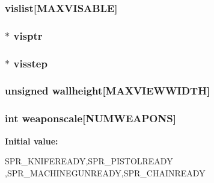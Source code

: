 \label{WL__DRAW_8C_a0ebb891d97bc41244012d2b8d7458f22}
\hypertarget{WL__DRAW_8C_a439daa25724f2dd91247db7c7aa6c36d}{
\subsubsection[{vislist}]{ {\bf vislist}\mbox{[}MAXVISABLE\mbox{]}}}
\label{WL__DRAW_8C_a439daa25724f2dd91247db7c7aa6c36d}
\hypertarget{WL__DRAW_8C_af3f4cde3f75a6b7f26bb1a3cfd2fe488}{
\subsubsection[{visptr}]{ $\ast$ {\bf visptr}}}
\label{WL__DRAW_8C_af3f4cde3f75a6b7f26bb1a3cfd2fe488}
\hypertarget{WL__DRAW_8C_a69e17f09bcc87eeb8d2d73ad447fe5c8}{
\subsubsection[{visstep}]{ $\ast$ {\bf visstep}}}
\label{WL__DRAW_8C_a69e17f09bcc87eeb8d2d73ad447fe5c8}
\hypertarget{WL__DRAW_8C_a9bae25635a51ae6d6ed9884e6cb79559}{
\subsubsection[{wallheight}]{\setlength{\rightskip}{0pt plus 5cm}unsigned {\bf wallheight}\mbox{[}MAXVIEWWIDTH\mbox{]}}}
\label{WL__DRAW_8C_a9bae25635a51ae6d6ed9884e6cb79559}
\hypertarget{WL__DRAW_8C_ae3f7f0ee388ee88187e292b982e09359}{
\subsubsection[{weaponscale}]{\setlength{\rightskip}{0pt plus 5cm}int {\bf weaponscale}\mbox{[}NUMWEAPONS\mbox{]}}}
\label{WL__DRAW_8C_ae3f7f0ee388ee88187e292b982e09359}
{\bfseries Initial value:}
\begin{DoxyCode}
 {SPR_KNIFEREADY,SPR_PISTOLREADY
        ,SPR_MACHINEGUNREADY,SPR_CHAINREADY}
\end{DoxyCode}
